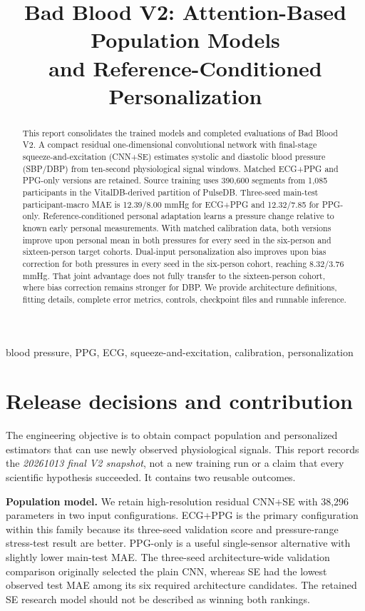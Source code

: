 \documentclass[conference]{IEEEtran}
\title{Bad Blood V2: Attention-Based Population Models\protect\\and Reference-Conditioned Personalization}
\author{\IEEEauthorblockN{Jingyi Guo}
\IEEEauthorblockA{Bad Blood Project, University of Notre Dame\\
Research and Engineering Results Report --- October 13, 2026}}
\begin{document}
\maketitle
\thispagestyle{plain}
\begin{abstract}
This report consolidates the trained models and completed evaluations of Bad
Blood V2. A compact residual one-dimensional convolutional network with
final-stage squeeze-and-excitation (CNN+SE) estimates systolic and diastolic
blood pressure (SBP/DBP) from ten-second physiological signal windows. Matched
ECG+PPG and PPG-only versions are retained. Source training uses 390,600
segments from 1,085 participants in the VitalDB-derived partition of PulseDB.
Three-seed main-test participant-macro MAE is 12.39/8.00 mmHg for ECG+PPG and
12.32/7.85 for PPG-only. Reference-conditioned personal adaptation learns a
pressure change relative to known early personal measurements. With matched
calibration data, both versions improve upon personal mean in both pressures
for every seed in the six-person and sixteen-person target cohorts. Dual-input
personalization also improves upon bias correction for both pressures in every
seed in the six-person cohort, reaching 8.32/3.76 mmHg. That joint advantage
does not fully transfer to the sixteen-person cohort, where bias correction
remains stronger for DBP. We provide architecture definitions, fitting details,
complete error metrics, controls, checkpoint files and runnable inference.
\end{abstract}
\begin{IEEEkeywords}
blood pressure, PPG, ECG, squeeze-and-excitation, calibration, personalization
\end{IEEEkeywords}

\section{Release decisions and contribution}
The engineering objective is to obtain compact population and personalized
estimators that can use newly observed physiological signals. This report
records the \emph{20261013 final V2 snapshot}, not a new training run or a claim
that every scientific hypothesis succeeded. It contains two reusable outcomes.

\textbf{Population model.} We retain high-resolution residual CNN+SE with
38,296 parameters in two input configurations. ECG+PPG is the primary
configuration within this family because its three-seed validation score and
pressure-range stress-test result are better. PPG-only is a useful single-sensor
alternative with slightly lower main-test MAE. The three-seed architecture-wide
validation comparison originally selected the plain CNN, whereas SE had the
lowest observed test MAE among its six required architecture candidates. The
retained SE research model should not be described as winning both rankings.
\end{document}

